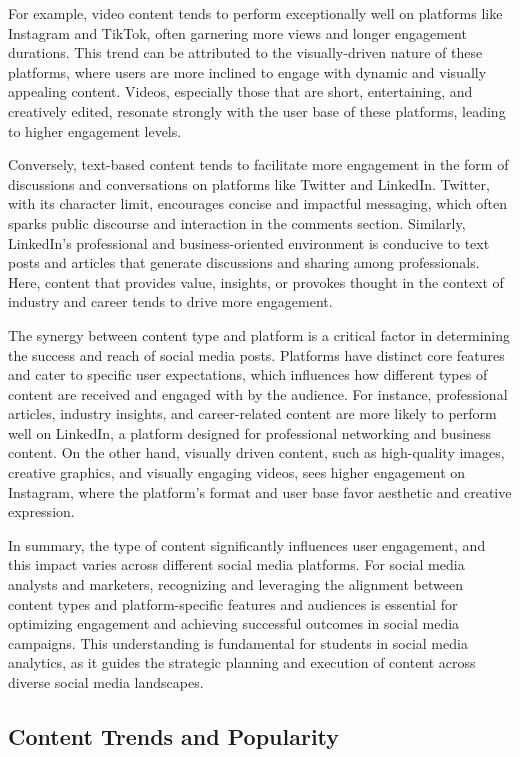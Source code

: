 \documentclass[
]{book}
\begin{document}
For example, video content tends to perform exceptionally well on platforms like Instagram and TikTok, often garnering more views and longer engagement durations. This trend can be attributed to the visually-driven nature of these platforms, where users are more inclined to engage with dynamic and visually appealing content. Videos, especially those that are short, entertaining, and creatively edited, resonate strongly with the user base of these platforms, leading to higher engagement levels.

Conversely, text-based content tends to facilitate more engagement in the form of discussions and conversations on platforms like Twitter and LinkedIn. Twitter, with its character limit, encourages concise and impactful messaging, which often sparks public discourse and interaction in the comments section. Similarly, LinkedIn's professional and business-oriented environment is conducive to text posts and articles that generate discussions and sharing among professionals. Here, content that provides value, insights, or provokes thought in the context of industry and career tends to drive more engagement.

The synergy between content type and platform is a critical factor in determining the success and reach of social media posts. Platforms have distinct core features and cater to specific user expectations, which influences how different types of content are received and engaged with by the audience. For instance, professional articles, industry insights, and career-related content are more likely to perform well on LinkedIn, a platform designed for professional networking and business content. On the other hand, visually driven content, such as high-quality images, creative graphics, and visually engaging videos, sees higher engagement on Instagram, where the platform's format and user base favor aesthetic and creative expression.

In summary, the type of content significantly influences user engagement, and this impact varies across different social media platforms. For social media analysts and marketers, recognizing and leveraging the alignment between content types and platform-specific features and audiences is essential for optimizing engagement and achieving successful outcomes in social media campaigns. This understanding is fundamental for students in social media analytics, as it guides the strategic planning and execution of content across diverse social media landscapes.

\hypertarget{content-trends-and-popularity}{%
\subsection*{Content Trends and Popularity}\label{content-trends-and-popularity}}
\end{document}
